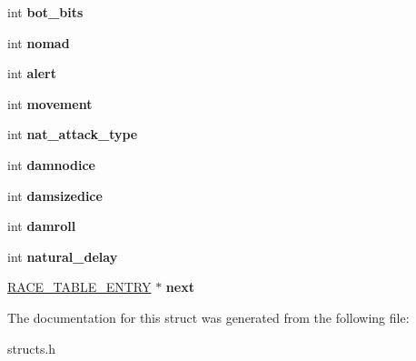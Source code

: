 \begin{DoxyCompactItemize}
\item 
\hypertarget{structrace__data_a647bbc5bd551b8fcec36a20586e8b6c3}{int {\bfseries bot\-\_\-bits}}\label{structrace__data_a647bbc5bd551b8fcec36a20586e8b6c3}

\item 
\hypertarget{structrace__data_aa3c05eb94e021134e9ec58302fd853c8}{int {\bfseries nomad}}\label{structrace__data_aa3c05eb94e021134e9ec58302fd853c8}

\item 
\hypertarget{structrace__data_a621752ac0b5eb4383c78d9f53ec9ae30}{int {\bfseries alert}}\label{structrace__data_a621752ac0b5eb4383c78d9f53ec9ae30}

\item 
\hypertarget{structrace__data_a41265bdb5463b70c40ed6e0b2c80e524}{int {\bfseries movement}}\label{structrace__data_a41265bdb5463b70c40ed6e0b2c80e524}

\item 
\hypertarget{structrace__data_a4b76257366e2806f00a6af2053f72d7b}{int {\bfseries nat\-\_\-attack\-\_\-type}}\label{structrace__data_a4b76257366e2806f00a6af2053f72d7b}

\item 
\hypertarget{structrace__data_a24175f6bde6122ac599912bf9fb27311}{int {\bfseries damnodice}}\label{structrace__data_a24175f6bde6122ac599912bf9fb27311}

\item 
\hypertarget{structrace__data_ad339f9ee861ea35a312e03815c04faae}{int {\bfseries damsizedice}}\label{structrace__data_ad339f9ee861ea35a312e03815c04faae}

\item 
\hypertarget{structrace__data_ad55979edf381b7ef1c68a0474dbb012a}{int {\bfseries damroll}}\label{structrace__data_ad55979edf381b7ef1c68a0474dbb012a}

\item 
\hypertarget{structrace__data_aa66a491ce4b1d0643a8437932791f7fb}{int {\bfseries natural\-\_\-delay}}\label{structrace__data_aa66a491ce4b1d0643a8437932791f7fb}

\item 
\hypertarget{structrace__data_a3b592ad13ca9a4120dbb6cef934de5c5}{\hyperlink{structrace__data}{R\-A\-C\-E\-\_\-\-T\-A\-B\-L\-E\-\_\-\-E\-N\-T\-R\-Y} $\ast$ {\bfseries next}}\label{structrace__data_a3b592ad13ca9a4120dbb6cef934de5c5}

\end{DoxyCompactItemize}


The documentation for this struct was generated from the following file\-:\begin{DoxyCompactItemize}
\item 
structs.\-h\end{DoxyCompactItemize}
